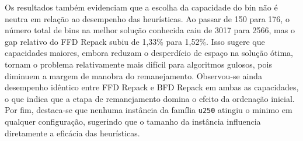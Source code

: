 \documentclass[12pt]{article}
\begin{document}
Os resultados também evidenciam que a escolha da capacidade do bin
não é neutra em relação ao desempenho das heurísticas. Ao passar de
150 para 176, o número total de bins na melhor solução conhecida caiu
de 3017 para 2566, mas o gap relativo do FFD Repack subiu de 1,33\%
para 1,52\%. Isso sugere que capacidades maiores, embora reduzam o
desperdício de espaço na solução ótima, tornam o problema
relativamente mais difícil para algoritmos gulosos, pois diminuem a
margem de manobra do remanejamento. Observou-se ainda desempenho
idêntico entre FFD Repack e BFD Repack em ambas as capacidades, o que
indica que a etapa de remanejamento domina o efeito da ordenação
inicial. Por fim, destaca-se que nenhuma instância da família
\texttt{u250} atingiu o minimo em qualquer configuração, sugerindo que
o tamanho da instância influencia diretamente a eficácia das
heurísticas.



\end{document}
